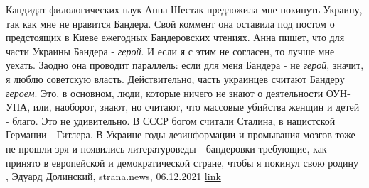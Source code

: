 Кандидат филологических наук Анна Шестак предложила мне покинуть Украину, так
как мне не нравится Бандера. Свой коммент она оставила под постом о предстоящих
в Киеве ежегодных Бандеровских чтениях.  Анна пишет, что для части Украины
Бандера - \emph{герой}. И если я с этим не согласен, то лучше мне уехать.
Заодно она проводит параллель: если для меня Бандера - не \emph{герой}, значит,
я люблю советскую власть.  Действительно, часть украинцев считают Бандеру
\emph{героем}. Это, в основном, люди, которые ничего не знают о деятельности
ОУН-УПА, или, наоборот, знают, но считают, что массовые убийства женщин и детей
- благо.  Это не удивительно. В СССР богом считали Сталина, в нацистской
Германии - Гитлера. В Украине годы дезинформации и промывания мозгов тоже не
прошли зря и появились литературоведы - бандеровки требующие, как принято в
европейской и демократической стране, чтобы я покинул свою родину
, 
Эдуард Долинский, strana.news, 06.12.2021
\href{https://strana.news/opinions/365623-za-neljubov-k-bandere-von-za-predely-ukrainy.html}{link}
